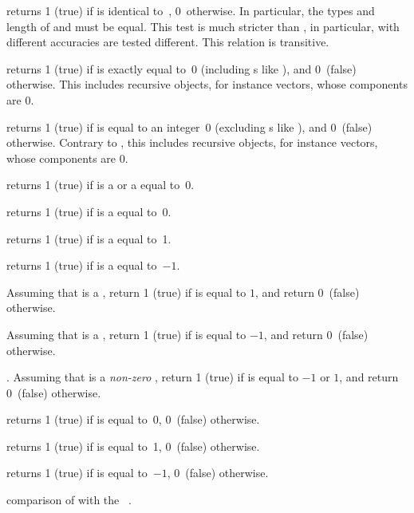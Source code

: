  returns 1 (true) if  is identical
to~, 0~otherwise. In particular, the types and length of  and
 must be equal. This test is much stricter than , in
particular,  with different accuracies are tested different. This
relation is transitive.


 returns 1 (true) if  is exactly equal
to~0 (including s like ), and 0~(false) otherwise.
This includes recursive objects, for instance vectors, whose components are $0$.

 returns 1 (true) if  is equal
to an integer~0 (excluding s like ), and 0~(false)
otherwise. Contrary to , this includes recursive objects, for
instance vectors, whose components are $0$.

 returns 1 (true) if  is a  or
a  equal to~0.

 returns 1 (true) if  is a 
equal to~0.

 returns 1 (true) if  is a 
equal to~1.

 returns 1 (true) if  is a 
equal to~$-1$.

Assuming that  is a , return 1 (true) if  is equal to
$1$, and return 0~(false) otherwise.

Assuming that  is a , return 1 (true) if  is equal to
$-1$, and return 0~(false) otherwise.

. Assuming that  is a
\emph{non-zero} , return 1 (true) if  is equal to $-1$ or
$1$, and return 0~(false) otherwise.

 returns 1 (true) if  is equal to~0, 0~(false)
otherwise.

 returns 1 (true) if  is equal to~1, 0~(false)
otherwise.

 returns 1 (true) if  is equal to~$-1$,
0~(false) otherwise.



 comparison of  with the
~.

